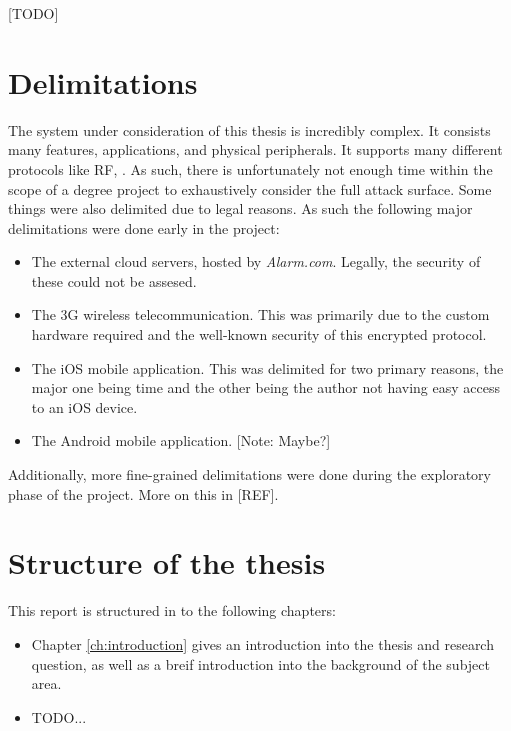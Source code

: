 [TODO]

\section{Delimitations} \label{ch:introduction:delimitations}
The system under consideration of this thesis is incredibly complex. It consists many features, applications, and physical peripherals. It supports many different protocols like RF, . As such, there is unfortunately not enough time within the scope of a degree project to exhaustively consider the full attack surface. Some things were also delimited due to legal reasons. As such the following major delimitations were done early in the project:

\begin{itemize}
    \item The external cloud servers, hosted by \textit{Alarm.com}. Legally, the security of these could not be assesed.
    \item The 3G wireless telecommunication. This was primarily due to the custom hardware required and the well-known security of this encrypted protocol.
    \item The iOS mobile application. This was delimited for two primary reasons, the major one being time and the other being the author not having easy access to an iOS device.
    \item The Android mobile application. [Note: Maybe?]
\end{itemize}

\noindent Additionally, more fine-grained delimitations were done during the exploratory phase of the project. More on this in [REF].

\section{Structure of the thesis} \label{ch:introduction:structure}
This report is structured in to the following chapters:
\begin{itemize}
    \item Chapter \ref{ch:introduction} gives an introduction into the thesis and research question, as well as a breif introduction into the background of the subject area.
    \item TODO...
\end{itemize}
